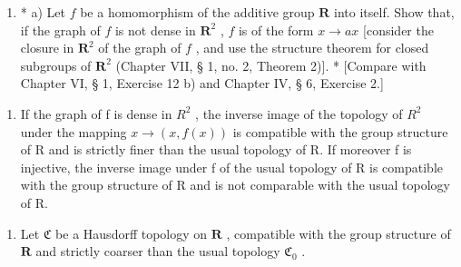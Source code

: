 \ExerciseSection

\begin{enumerate}
\def\labelenumi{\arabic{enumi})}
\tightlist
\item
  * a) Let \(f\) be a homomorphism of the additive group \(\mathbf{R}\) into itself. Show that, if the graph of \(f\) is not dense in \(\mathbf{R}^2\) , \(f\) is of the form \(x \to ax\) {[}consider the closure in \(\mathbf{R}^2\) of the graph of \(f\) , and use the structure theorem for closed subgroups of \(\mathbf{R}^2\) (Chapter VII, § 1, no. 2, Theorem 2){]}. * {[}Compare with Chapter VI, § 1, Exercise 12 b) and Chapter IV, § 6, Exercise 2.{]}
\end{enumerate}

\begin{enumerate}
\def\labelenumi{\alph{enumi})}
\setcounter{enumi}{1}
\tightlist
\item
  If the graph of f is dense in \(R^{2}\) , the inverse image of the topology of \(R^{2}\) under the mapping \(x \to (x, f(x))\) is compatible with the group structure of R and is strictly finer than the usual topology of R. If moreover f is injective, the inverse image under f of the usual topology of R is compatible with the group structure of R and is not comparable with the usual topology of R.
\end{enumerate}

\begin{enumerate}
\def\labelenumi{\arabic{enumi})}
\setcounter{enumi}{1}
\tightlist
\item
  Let \(\mathfrak{C}\) be a Hausdorff topology on \(\mathbf{R}\) , compatible with the group structure of \(\mathbf{R}\) and strictly coarser than the usual topology \(\mathfrak{C}_0\) .
\end{enumerate}


